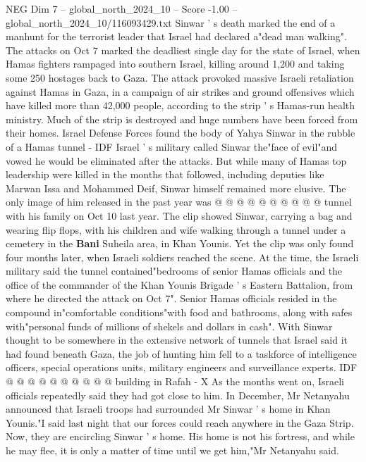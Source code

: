 \begin{textsample}{NEG Dim 7 – global\_north\_2024\_10 – Score -1.00 – global\_north\_2024\_10/116093429.txt}  \label{ex:f7_neg_357}
Sinwar ' s death marked the end of a manhunt for the terrorist leader that Israel had declared a"dead man walking".
The attacks on Oct 7 marked the deadliest single day for the state of Israel, when Hamas fighters rampaged into southern Israel, killing around 1,200 and taking some 250 hostages back to Gaza.
The attack provoked massive Israeli retaliation against Hamas in Gaza, in a campaign of air strikes and ground offensives which have killed more than 42,000 people, according to the strip ' s Hamas-run health ministry.
Much of the strip is destroyed and huge numbers have been forced from their homes.
Israel Defense Forces found the body of Yahya Sinwar in the rubble of a Hamas tunnel - IDF Israel ' s military called Sinwar the"face of evil"and vowed he would be eliminated after the attacks.
But while many of Hamas top leadership were killed in the months that followed, including deputies like Marwan Issa and Mohammed Deif, Sinwar himself remained more elusive.
The only image of him released in the past year was @ @ @ @ @ @ @ @ @ @ tunnel with his family on Oct 10 last year.
The clip showed Sinwar, carrying a bag and wearing flip flops, with his children and wife walking through a tunnel under a cemetery in the \textbf{Bani} Suheila area, in Khan Younis.
Yet the clip was only found four months later, when Israeli soldiers reached the scene.
At the time, the Israeli military said the tunnel contained"bedrooms of senior Hamas officials and the office of the commander of the Khan Younis Brigade ' s Eastern Battalion, from where he directed the attack on Oct 7".
Senior Hamas officials resided in the compound in"comfortable conditions"with food and bathrooms, along with safes with"personal funds of millions of shekels and dollars in cash".
With Sinwar thought to be somewhere in the extensive network of tunnels that Israel said it had found beneath Gaza, the job of hunting him fell to a taskforce of intelligence officers, special operations units, military engineers and surveillance experts.
IDF @ @ @ @ @ @ @ @ @ @ building in Rafah - X As the months went on, Israeli officials repeatedly said they had got close to him.
In December, Mr Netanyahu announced that Israeli troops had surrounded Mr Sinwar ' s home in Khan Younis."I said last night that our forces could reach anywhere in the Gaza Strip.
Now, they are encircling Sinwar ' s home.
His home is not his fortress, and while he may flee, it is only a matter of time until we get him,"Mr Netanyahu said.

\end{textsample}

